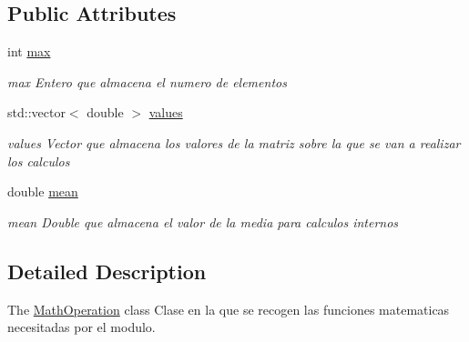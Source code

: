 \subsection*{Public Attributes}
\begin{DoxyCompactItemize}
\item 
\hypertarget{class_math_operation_a6c76d3b9b52885d4e7a7712b92224275}{int \hyperlink{class_math_operation_a6c76d3b9b52885d4e7a7712b92224275}{max}}\label{class_math_operation_a6c76d3b9b52885d4e7a7712b92224275}

\begin{DoxyCompactList}\small\item\em max Entero que almacena el numero de elementos \end{DoxyCompactList}\item 
\hypertarget{class_math_operation_af9e269ecc7a79efe7490690dc9e70445}{std\+::vector$<$ double $>$ \hyperlink{class_math_operation_af9e269ecc7a79efe7490690dc9e70445}{values}}\label{class_math_operation_af9e269ecc7a79efe7490690dc9e70445}

\begin{DoxyCompactList}\small\item\em values Vector que almacena los valores de la matriz sobre la que se van a realizar los calculos \end{DoxyCompactList}\item 
\hypertarget{class_math_operation_a1dec04505997677a4dedbf645d4d128c}{double \hyperlink{class_math_operation_a1dec04505997677a4dedbf645d4d128c}{mean}}\label{class_math_operation_a1dec04505997677a4dedbf645d4d128c}

\begin{DoxyCompactList}\small\item\em mean Double que almacena el valor de la media para calculos internos \end{DoxyCompactList}\end{DoxyCompactItemize}


\subsection{Detailed Description}
The \hyperlink{class_math_operation}{Math\+Operation} class Clase en la que se recogen las funciones matematicas necesitadas por el modulo. 

